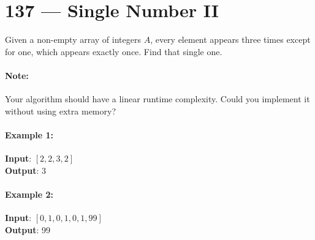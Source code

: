 \section{137 --- Single Number II}
Given a non-empty array of integers $A$, every element appears three times except for one, which appears exactly once. Find that single one.
\paragraph{Note:}
\begin{flushleft}
Your algorithm should have a linear runtime complexity. Could you implement it without using extra memory?
\end{flushleft}
\paragraph{Example 1:}
\begin{flushleft}
\textbf{Input}: $[2,2,3,2]$
\\
\textbf{Output}: 3
\end{flushleft}
\paragraph{Example 2:}
\begin{flushleft}
\textbf{Input}: $[0,1,0,1,0,1,99]$
\\
\textbf{Output}: 99
\end{flushleft}

